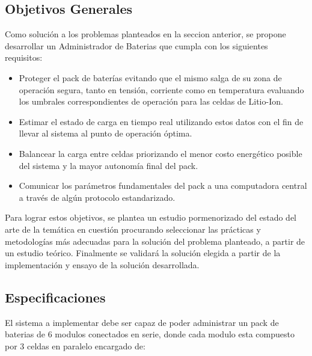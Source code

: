 \documentclass[10pt,a4paper]{article}
\begin{document}
	\subsection{Objetivos Generales}

    Como solución a los problemas planteados en la seccion anterior, se propone
	desarrollar un Administrador de Baterias que cumpla con los siguientes
    requisitos:

    \begin{itemize}
        \item Proteger el pack de baterías evitando que el mismo salga de su 
        zona de operación segura, tanto en tensión, corriente como en 
        temperatura evaluando los umbrales correspondientes de operación para 
        las celdas de Litio-Ion.
        \item Estimar el estado de carga en tiempo real utilizando estos datos 
        con el fin de llevar al sistema al punto de operación óptima.
        \item Balancear la carga entre celdas priorizando el menor costo 
        energético posible del sistema y la mayor autonomía final del pack.
        \item Comunicar los parámetros fundamentales del pack a una computadora 
        central a través de algún protocolo estandarizado.
    \end{itemize}

	\noindent Para lograr estos objetivos, se plantea un estudio pormenorizado 
    del estado del arte de la temática en cuestión procurando seleccionar las 
    prácticas y metodologías más adecuadas para la solución del problema 
    planteado, a partir de un estudio teórico. Finalmente se validará la 
    solución elegida a partir de la implementación y ensayo de la solución 
    desarrollada.
	
	\subsection{Especificaciones}

    \noindent El sistema a implementar debe ser capaz de poder administrar un 
    pack de baterias de 6 modulos conectados en serie, donde cada modulo esta 
    compuesto por 3 celdas en paralelo encargado de: 
	
\end{document}
